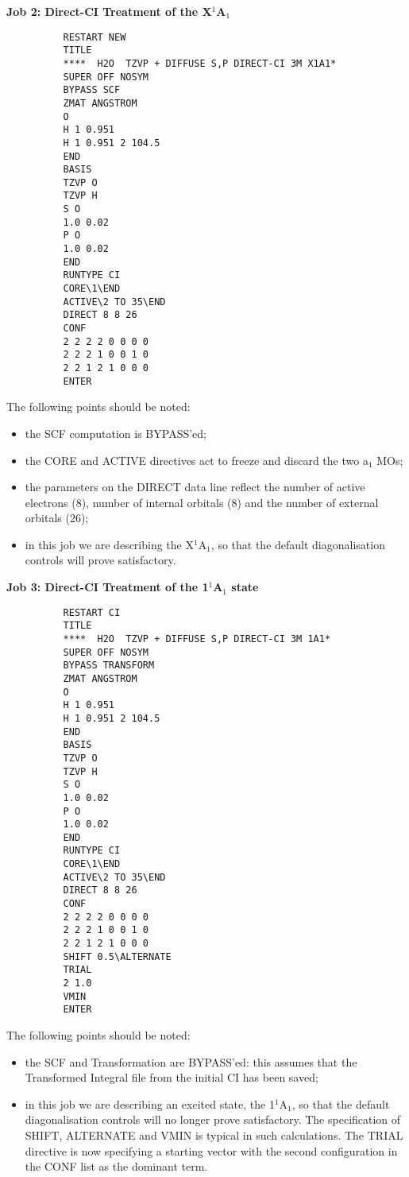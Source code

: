 \documentclass[11pt,fleqn]{article}
\newcommand{\xastate}{\mbox{X$^{1}$A$_{1}$}}
\begin{document}
{\bf Job 2: Direct-CI Treatment of the \xastate}
{
\footnotesize
\begin{verbatim}
          RESTART NEW
          TITLE  
          ****  H2O  TZVP + DIFFUSE S,P DIRECT-CI 3M X1A1*
          SUPER OFF NOSYM
          BYPASS SCF
          ZMAT ANGSTROM
          O
          H 1 0.951
          H 1 0.951 2 104.5
          END
          BASIS 
          TZVP O
          TZVP H
          S O
          1.0 0.02
          P O
          1.0 0.02
          END
          RUNTYPE CI
          CORE\1\END
          ACTIVE\2 TO 35\END
          DIRECT 8 8 26
          CONF
          2 2 2 2 0 0 0 0
          2 2 2 1 0 0 1 0
          2 2 1 2 1 0 0 0
          ENTER
\end{verbatim}
}
The following points should be noted:
\begin{itemize}
\item the SCF computation is BYPASS'ed;
\item the CORE and ACTIVE directives act to
freeze and discard  the two a$_{1}$ MOs;
\item the parameters on the DIRECT data line reflect the number
of active electrons (8), number of internal orbitals (8) and
the number of external orbitals (26);
\item in this job we are describing the \xastate, so that the
default diagonalisation controls will prove satisfactory.
\end{itemize}
{\bf Job 3: Direct-CI Treatment of the 1$^{1}$A$_{1}$ state}
{
\footnotesize
\begin{verbatim}
          RESTART CI
          TITLE  
          ****  H2O  TZVP + DIFFUSE S,P DIRECT-CI 3M 1A1*
          SUPER OFF NOSYM
          BYPASS TRANSFORM
          ZMAT ANGSTROM
          O
          H 1 0.951
          H 1 0.951 2 104.5
          END
          BASIS 
          TZVP O
          TZVP H
          S O
          1.0 0.02
          P O
          1.0 0.02
          END
          RUNTYPE CI
          CORE\1\END
          ACTIVE\2 TO 35\END
          DIRECT 8 8 26
          CONF
          2 2 2 2 0 0 0 0
          2 2 2 1 0 0 1 0
          2 2 1 2 1 0 0 0
          SHIFT 0.5\ALTERNATE
          TRIAL
          2 1.0
          VMIN
          ENTER
\end{verbatim}
}
The following points should be noted:
\begin{itemize}
\item the SCF and Transformation are BYPASS'ed: this assumes
that the Transformed Integral file from the initial CI has
been saved;
\item in this job we are describing an excited state, the 
1$^{1}$A$_{1}$, so that the
default diagonalisation controls will no longer prove satisfactory.
The specification of
SHIFT, ALTERNATE and VMIN is typical in such calculations.
The TRIAL directive
is now specifying a starting vector with the second configuration
in the CONF list as the dominant term.
\end{itemize}
\end{document}
